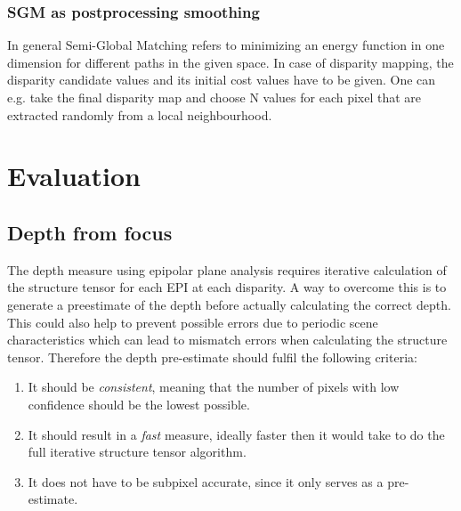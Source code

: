\documentclass  [
  paper    = a4,
  BCOR     = 10mm,
  twoside,
  fontsize = 12pt,
  fleqn,
  toc      = bibnumbered,
  toc      = listofnumbered,
  numbers  = noendperiod,
  headings = normal,
  listof   = leveldown,
  version  = 3.03
]                                       {scrreprt}
\begin{document}
\subsection{SGM as postprocessing smoothing}
In general Semi-Global Matching refers to minimizing an energy function in one dimension for different paths in the given space. In case of disparity mapping, the disparity candidate values and its initial cost values have to be given. One can e.g. take the final disparity map and choose N values for each pixel that are extracted randomly from a local neighbourhood. 


\chapter{Evaluation}
\label{Evaluation}
\section{Depth from focus}
\label{sec: depth from focus}
The depth measure using epipolar plane analysis requires iterative calculation of the structure tensor for each EPI at each disparity. A way to overcome this is to generate a preestimate of the depth before actually calculating the correct depth. This could also help to prevent possible errors due to periodic scene characteristics which can lead to mismatch errors when calculating the structure tensor. Therefore the depth pre-estimate should fulfil the following criteria:
\begin{enumerate}
	\item It should be \textit{consistent}, meaning that the number of pixels with low confidence should be the lowest possible.
	\item It should result in a \textit{fast} measure, ideally faster then it would take to do the full iterative structure tensor algorithm.
	\item It does not have to be subpixel accurate, since it only serves as a pre-estimate. 
\end{enumerate}
\end{document}
